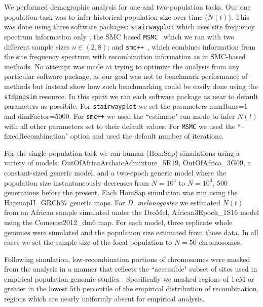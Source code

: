 \documentclass[12pt,halfline,a4paper]{ouparticle}
\newcommand{\stdpopsim}{\texttt{stdpopsim}\xspace}
\newcommand{\MSMC}{\texttt{MSMC}\xspace}
\newcommand{\smcpp}{\texttt{smc++}\xspace}
\newcommand{\stairwayplot}{\texttt{stairwayplot}\xspace}
\begin{document}
We performed demographic analysis for one-and two-population tasks.
Our one population task was to infer historical population size over
time ($N(t)$). This was done using three software packages: \stairwayplot
which uses site frequency spectrum information only \citep{liu2015exploring};
the SMC based \MSMC~\citep{schiffels2014inferring} which we ran with two different
sample sizes $n\in (2 , 8)$; and \smcpp~\citep{terhorst2017robust},
which combines information from the site frequency spectrum with
recombination information as in SMC-based methods. No attempt
was made at trying to optimize the analysis from
any particular software package,
as our goal was not to benchmark performance of methods but
instead show how such benchmarking could be easily done using
the \stdpopsim resource. In this spirit we ran each software package as near
to default parameters as possibile. For \stairwayplot we
set the parameters numRuns=1 and dimFactor=5000. For \smcpp we used the
``estimate" run mode to infer $N(t)$ with all other parameters set
to their default values. For \MSMC we used the ``--fixedRecombination"
option and used the default number of iterations.

For the single-population task we ran human (HomSap) simulations
using a variety of models: OutOfAfricaArchaicAdmixture\_5R19, OutOfAfrica\_3G09,
a constant-sized generic model, and a two-epoch generic model where the
population size instantaneously decreases from $N=10^4$ to $N=10^3$, 500
generations before the present. Each HomSap simulation was run
using the HapmapII\_GRCh37 genetic maps. For \emph{D. melanogaster}
we estimated $N(t)$ from an African sample simulated under the DroMel,
African3Epoch\_1S16 model using the Comeron2012\_dm6 map.
For each model, three replicate whole genomes were
simulated and the population size estimated from those data. In all cases we
set the sample size of the focal population to $N=50$ chromosomes.

Following simulation, low-recombination portions of chromosomes were masked
from the analysis in a manner that reflects the ``accessible" subset of sites
used in empirical population genomic studies \citep[e.g.,][]{danecek20111000,langley2012genomic}.
Specifically we masked regions of 1\,cM or greater in the lowest 5th percentile of the empirical
distribution of recombination, regions which are nearly uniformly absent for
empirical analysis.
\end{document}
